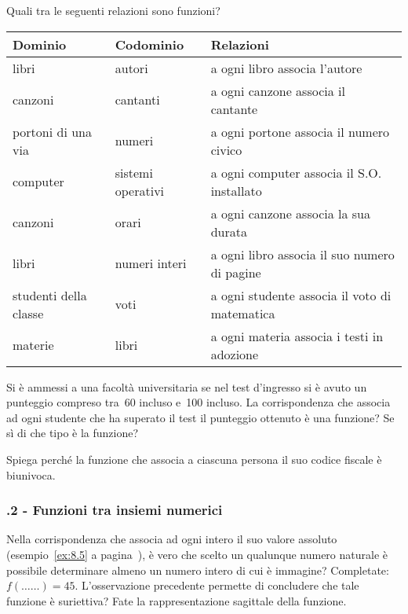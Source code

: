 \begin{esercizio}
 \label{ese:\thechapter.3}
Quali tra le seguenti relazioni sono funzioni?
\begin{center}
 \begin{tabular}{*3{l}}
 \toprule
  Dominio & Codominio & Relazioni\\
\midrule
libri & autori & a ogni libro associa l'autore\\
canzoni & cantanti & a ogni canzone associa il cantante\\
portoni di una via & numeri & a ogni portone associa il numero civico\\
computer & sistemi operativi & a ogni computer associa il S.O. installato\\
canzoni & orari & a ogni canzone associa la sua durata\\
libri & numeri interi & a ogni libro associa il suo numero di pagine\\
studenti della classe & voti & a ogni studente associa il voto di matematica\\
materie & libri & a ogni materia associa i testi in adozione\\
\bottomrule
 \end{tabular}
\end{center}
\end{esercizio}

\begin{esercizio}
 \label{ese:\thechapter.4}
Si è ammessi a una facoltà universitaria se nel test
d'ingresso si è avuto un punteggio compreso tra~60
incluso e~100 incluso. La corrispondenza che associa ad ogni studente
che ha superato il test il punteggio ottenuto è una funzione? Se sì
di che tipo è la funzione?
\end{esercizio}


\begin{esercizio}
 \label{ese:\thechapter.5}
Spiega perché la funzione che associa a ciascuna
persona il suo codice fiscale è biunivoca.
\end{esercizio}

\subsubsection*{\thechapter.2 - Funzioni tra insiemi numerici}
\begin{esercizio}
 \label{ese:\thechapter.6}
Nella corrispondenza che associa ad ogni intero il suo valore assoluto (esempio~\ref{ex:8.5} a pagina~\pageref{ex:8.5}), è vero che scelto un qualunque numero naturale è
possibile determinare almeno un numero intero di cui è immagine?
Completate:~$f(\ldots\ldots) = 45.$
L'osservazione precedente permette di concludere che
tale funzione è suriettiva?
Fate la rappresentazione sagittale della funzione.
\end{esercizio}

